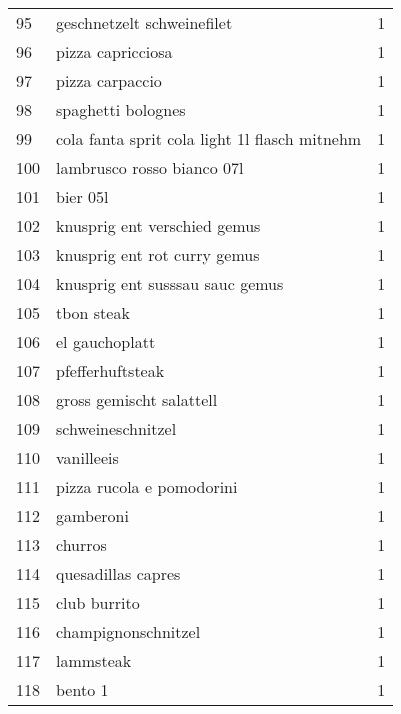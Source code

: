 \begin{tabular}{llr}
95  &                         geschnetzelt schweinefilet &      1 \\
96  &                                  pizza capricciosa &      1 \\
97  &                                    pizza carpaccio &      1 \\
98  &                                 spaghetti bolognes &      1 \\
99  &      cola fanta sprit cola light 1l flasch mitnehm &      1 \\
100 &                         lambrusco rosso bianco 07l &      1 \\
101 &                                           bier 05l &      1 \\
102 &                       knusprig ent verschied gemus &      1 \\
103 &                       knusprig ent rot curry gemus &      1 \\
104 &                    knusprig ent susssau sauc gemus &      1 \\
105 &                                         tbon steak &      1 \\
106 &                                     el gauchoplatt &      1 \\
107 &                                   pfefferhuftsteak &      1 \\
108 &                           gross gemischt salattell &      1 \\
109 &                                  schweineschnitzel &      1 \\
110 &                                         vanilleeis &      1 \\
111 &                          pizza rucola e pomodorini &      1 \\
112 &                                          gamberoni &      1 \\
113 &                                            churros &      1 \\
114 &                                 quesadillas capres &      1 \\
115 &                                       club burrito &      1 \\
116 &                                champignonschnitzel &      1 \\
117 &                                          lammsteak &      1 \\
118 &                                            bento 1 &      1 \\

\end{tabular}

